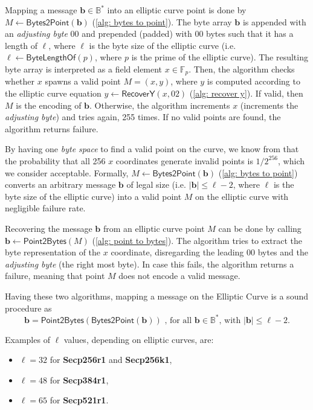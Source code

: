 Mapping a message $\boldsymbol{b} \in \mathbb{B}^*$ into an elliptic curve point is done by $M \gets \mathsf{Bytes2Point}(\boldsymbol{b})$ (\cref{alg: bytes to point}). The byte array $\boldsymbol{b}$ is appended with an \textit{adjusting byte} $00$ and prepended (padded) with $00$ bytes such that it has a length of $\ell$, where $\ell$ is the byte size of the elliptic curve (i.e. $\ell \gets \mathsf{ByteLengthOf}(p)$, where $p$ is the prime of the elliptic curve). The resulting byte array is interpreted as a field element $x \in \mathbb{F}_p$. Then, the algorithm checks whether $x$ spawns a valid point $M = (x, y)$, where $y$ is computed according to the elliptic curve equation $y \gets \mathsf{RecoverY}(x, 02)$ (\cref{alg: recover y}). If valid, then $M$ is the encoding of $\boldsymbol{b}$. Otherwise, the algorithm increments $x$ (increments the \textit{adjusting byte}) and tries again, 255 times. If no valid points are found, the algorithm returns failure.

By having one \textit{byte space} to find a valid point on the curve, we know from \cite{Trappe05} that the probability that all 256 $x$ coordinates generate invalid points is $1/2^{256}$, which we consider acceptable. Formally, $M \gets \mathsf{Bytes2Point}(\boldsymbol{b})$ (\cref{alg: bytes to point}) converts an arbitrary message $\boldsymbol{b}$ of legal size (i.e. $|\boldsymbol{b}| \leq \ell - 2$, where $\ell$ is the byte size of the elliptic curve) into a valid point $M$ on the elliptic curve with negligible failure rate.

Recovering the message $\boldsymbol{b}$ from an elliptic curve point $M$ can be done by calling $\boldsymbol{b} \gets \mathsf{Point2Bytes}(M)$ (\cref{alg: point to bytes}). The algorithm tries to extract the byte representation of the $x$ coordinate, disregarding the leading $00$ bytes and the \textit{adjusting byte} (the right most byte). In case this fails, the algorithm returns a failure, meaning that point $M$ does not encode a valid message.

Having these two algorithms, mapping a message on the Elliptic Curve is a sound procedure as
\[ \boldsymbol{b} = \mathsf{Point2Bytes}(\mathsf{Bytes2Point}(\boldsymbol{b})) \text{ , for all $\boldsymbol{b} \in \mathbb{B}^*$, with $|\boldsymbol{b}| \leq \ell - 2$.} \]

Examples of $\ell$ values, depending on elliptic curves, are:
\begin{itemize}
    \item $\ell = 32$ for \textbf{Secp256r1 } and \textbf{Secp256k1},
    \item $\ell = 48$ for \textbf{Secp384r1},
    \item $\ell = 65$ for \textbf{Secp521r1}.
\end{itemize}

